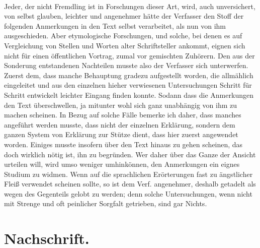 \documentclass[a4paper, 11pt, oneside]{article}
\begin{document}
\paragraph{}
Jeder, der nicht Fremdling ist in Forschungen dieser Art, wird, auch unversichert, von selbst glauben, leichter und angenehmer hätte der Verfasser den Stoff der folgenden Anmerkungen in den Text selbst verarbeitet, als nun von ihm ausgeschieden. Aber etymologische Forschungen, und solche, bei denen es auf Vergleichung von Stellen und Worten alter Schriftsteller ankommt, eignen sich nicht für einen öffentlichen Vortrag, zumal vor gemischten Zuhörern. Den aus der Sonderung entstandenen Nachteilen musste also der Verfasser sich unterwerfen. Zuerst dem, dass manche Behauptung gradezu aufgestellt worden, die allmählich eingeleitet und aus den einzelnen hieher verwiesenen Untersuchungen Schritt für Schritt entwickelt leichter Eingang finden konnte. Sodann dass die Anmerkungen den Text überschwellen, ja mitunter wohl sich ganz unabhängig von ihm zu machen scheinen. In Bezug auf solche Fälle bemerke ich daher, dass manches angeführt werden musste, dass nicht der einzelnen Erklärung, sondern dem ganzen System von Erklärung zur Stütze dient, dass hier zuerst angewendet worden. Einiges musste insofern über den Text hinaus zu gehen scheinen, das doch wirklich nötig ist, ihn zu begründen. Wer daher über das Ganze der Ansicht urteilen will, wird umso weniger umhinkönnen, den Anmerkungen ein eignes Studium zu widmen. Wenn auf die sprachlichen Erörterungen fast zu ängstlicher Fleiß verwendet scheinen sollte, so ist dem Verf. angenehmer, deshalb getadelt als wegen des Gegenteils gelobt zu werden; denn solche Untersuchungen, wenn nicht mit Strenge und oft peinlicher Sorgfalt getrieben, sind gar Nichts.
\clearpage
\section{Nachschrift.}
\end{document}
